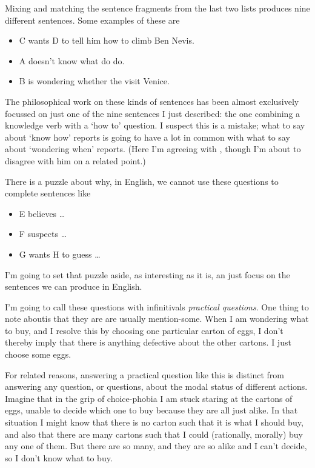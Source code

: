 \documentclass[11pt,]{book}
\providecommand{\tightlist}{%
  \setlength{\itemsep}{0pt}\setlength{\parskip}{0pt}}
\begin{document}
Mixing and matching the sentence fragments from the last two lists produces nine different sentences. Some examples of these are

\begin{itemize}
\tightlist
\item
  C wants D to tell him how to climb Ben Nevis.
\item
  A doesn't know what do do.
\item
  B is wondering whether the visit Venice.
\end{itemize}

The philosophical work on these kinds of sentences has been almost exclusively focussed on just one of the nine sentences I just described: the one combining a knowledge verb with a `how to' question. I suspect this is a mistake; what to say about `know how' reports is going to have a lot in common with what to say about `wondering when' reports. (Here I'm agreeing with \citet{Stanley2011}, though I'm about to disagree with him on a related point.)

There is a puzzle about why, in English, we cannot use these questions to complete sentences like

\begin{itemize}
\tightlist
\item
  E believes \ldots{}
\item
  F suspects \ldots{}
\item
  G wants H to guess \ldots{}
\end{itemize}

I'm going to set that puzzle aside, as interesting as it is, an just focus on the sentences we can produce in English.

I'm going to call these questions with infinitivals \emph{practical questions}. One thing to note aboutis that they are are usually mention-some. When I am wondering what to buy, and I resolve this by choosing one particular carton of eggs, I don't thereby imply that there is anything defective about the other cartons. I just choose some eggs.

For related reasons, answering a practical question like this is distinct from answering any question, or questions, about the modal status of different actions. Imagine that in the grip of choice-phobia I am stuck staring at the cartons of eggs, unable to decide which one to buy because they are all just alike. In that situation I might know that there is no carton such that it is what I should buy, and also that there are many cartons such that I could (rationally, morally) buy any one of them. But there are so many, and they are so alike and I can't decide, so I don't know what to buy.
\end{document}
